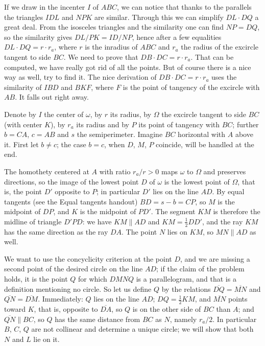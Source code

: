 {}{
    If we draw in the incenter $I$ of $ABC$, we can notice that thanks to the parallels the triangles $IDL$ and $NPK$ are similar. Through this we can simplify $DL \cdot DQ$ a great deal.
}{
    From the isosceles triangles and the similarity one can find $NP=DQ$, so the similarity gives $DL/PK=ID/NP$, hence after a few equalities $DL \cdot DQ = r \cdot r_a$, where $r$ is the inradius of $ABC$ and $r_a$ the radius of the excircle tangent to side $BC$. We need to prove that $DB \cdot DC = r \cdot r_a$. That can be computed, we have really got rid of all the points. But of course there is a nice way as well, try to find it.
}{
    The nice derivation of $DB \cdot DC = r \cdot r_a$ uses the similarity of $IBD$ and $BKF$, where $F$ is the point of tangency of the excircle with $AB$. It falls out right away.
}{
    Denote by $I$ the center of $\omega$, by $r$ its radius, by $\Omega$ the excircle tangent to side $BC$ (with center $K$), by $r_a$ its radius and by $P$ its point of tangency with $BC$; further $b=CA$, $c=AB$ and $s$ the semiperimeter. Imagine $BC$ horizontal with $A$ above it. First let $b \neq c$; the case $b=c$, when $D$, $M$, $P$ coincide, will be handled at the end.

    The homothety centered at $A$ with ratio $r_a/r > 0$ maps $\omega$ to $\Omega$ and preserves directions, so the image of the lowest point $D$ of $\omega$ is the lowest point of $\Omega$, that is, the point $D'$ opposite to $P$; in particular $D'$ lies on the line $AD$. By equal tangents (see the Equal tangents handout) $BD = s-b = CP$, so $M$ is the midpoint of $DP$, and $K$ is the midpoint of $PD'$. The segment $KM$ is therefore the midline of triangle $D'PD$: we have $KM \parallel AD$ and $KM = \tfrac12 DD'$, and the ray $KM$ has the same direction as the ray $DA$. The point $N$ lies on $KM$, so $MN \parallel AD$ as well.

    We want to use the concyclicity criterion at the point $D$, and we are missing a second point of the desired circle on the line $AD$; if the claim of the problem holds, it is the point $Q$ for which $DMNQ$ is a parallelogram, and that is a definition mentioning no circle. So let us define $Q$ by the relations $\overline{DQ} = \overline{MN}$ and $\overline{QN} = \overline{DM}$. Immediately: $Q$ lies on the line $AD$; $DQ = \tfrac12 KM$, and $\overline{MN}$ points toward $K$, that is, opposite to $\overline{DA}$, so $Q$ is on the other side of $BC$ than $A$; and $\overline{QN} \parallel BC$, so $Q$ has the same distance from $BC$ as $N$, namely $r_a/2$. In particular $B$, $C$, $Q$ are not collinear and determine a unique circle; we will show that both $N$ and $L$ lie on it.

}
